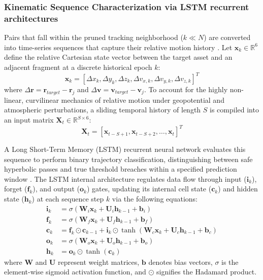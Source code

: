 \documentclass[letterpaper,11pt]{AAS}
\begin{document}
\subsubsection{Kinematic Sequence Characterization via LSTM recurrent architectures}
Pairs that fall within the pruned tracking neighborhood ($k \ll N$) are converted into time-series sequences that capture their relative motion history \cite{Abstract_AIAA_ASC_2026.pdf}. Let $\mathbf{x}_k \in \mathbb{R}^6$ define the relative Cartesian state vector between the target asset and an adjacent fragment at a discrete historical epoch $k$:
\begin{equation}
    \mathbf{x}_k = \left[ \Delta x_k, \Delta y_k, \Delta z_k, \Delta v_{x,k}, \Delta v_{y,k}, \Delta v_{z,k} \right]^T
    \label{eq:relative_state_vector}
\end{equation}
where $\Delta \mathbf{r} = \mathbf{r}_{target} - \mathbf{r}_j$ and $\Delta \mathbf{v} = \mathbf{v}_{target} - \mathbf{v}_j$. To account for the highly non-linear, curvilinear mechanics of relative motion under geopotential and atmospheric perturbations, a sliding temporal history of length $S$ is compiled into an input matrix $\mathbf{X}_t \in \mathbb{R}^{S \times 6}$:
\begin{equation}
    \mathbf{X}_t = \left[ \mathbf{x}_{t-S+1}, \mathbf{x}_{t-S+2}, \dots, \mathbf{x}_t \right]^T
    \label{eq:sequence_matrix}
\end{equation}

A Long Short-Term Memory (LSTM) recurrent neural network evaluates this sequence to perform binary trajectory classification, distinguishing between safe hyperbolic passes and true threshold breaches within a specified prediction window \cite{Abstract_AIAA_ASC_2026.pdf}. The LSTM internal architecture regulates data flow through input ($\mathbf{i}_k$), forget ($\mathbf{f}_k$), and output ($\mathbf{o}_k$) gates, updating its internal cell state ($\mathbf{c}_k$) and hidden state ($\mathbf{h}_k$) at each sequence step $k$ via the following equations:
\begin{align}
    \mathbf{i}_k &= \sigma\left( \mathbf{W}_i \mathbf{x}_k + \mathbf{U}_i \mathbf{h}_{k-1} + \mathbf{b}_i \right) \\
    \mathbf{f}_k &= \sigma\left( \mathbf{W}_f \mathbf{x}_k + \mathbf{U}_f \mathbf{h}_{k-1} + \mathbf{b}_f \right) \\
    \mathbf{c}_k &= \mathbf{f}_k \odot \mathbf{c}_{k-1} + \mathbf{i}_k \odot \tanh\left( \mathbf{W}_c \mathbf{x}_k + \mathbf{U}_c \mathbf{h}_{k-1} + \mathbf{b}_c \right) \\
    \mathbf{o}_k &= \sigma\left( \mathbf{W}_o \mathbf{x}_k + \mathbf{U}_o \mathbf{h}_{k-1} + \mathbf{b}_o \right) \\
    \mathbf{h}_k &= \mathbf{o}_k \odot \tanh\left( \mathbf{c}_k \right)
\end{align}
where $\mathbf{W}$ and $\mathbf{U}$ represent weight matrices, $\mathbf{b}$ denotes bias vectors, $\sigma$ is the element-wise sigmoid activation function, and $\odot$ signifies the Hadamard product.
\end{document}
